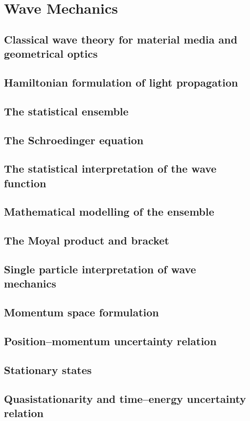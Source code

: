 \documentclass{article}
\begin{document}
\section{Wave Mechanics}
\subsection{Classical wave theory for material media and geometrical optics}
\subsection{Hamiltonian formulation of light propagation}
\subsection{The statistical ensemble}
\subsection{The Schroedinger equation}
\subsection{The statistical interpretation of the wave function}
\subsection{Mathematical modelling of the ensemble}
\subsection{The Moyal product and bracket}
\subsection{Single particle interpretation of wave mechanics}
\subsection{Momentum space formulation}
\subsection{Position–momentum uncertainty relation}
\subsection{Stationary states}
\subsection{Quasistationarity and time–energy uncertainty relation}
\end{document}
